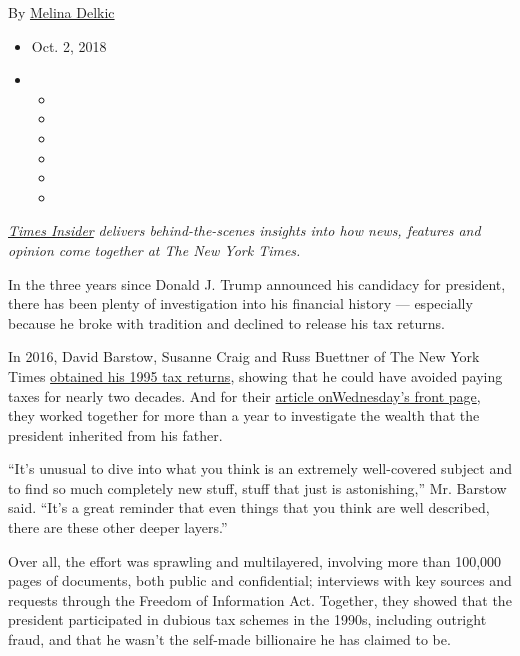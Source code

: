 By \href{https://www.nytimes3xbfgragh.onion/by/melina-delkic}{Melina
Delkic}

\begin{itemize}
\item
  Oct. 2, 2018
\item
  \begin{itemize}
  \item
  \item
  \item
  \item
  \item
  \item
  \end{itemize}
\end{itemize}

\href{http://www.nytimes3xbfgragh.onion/section/insider}{\emph{Times
Insider}} \emph{delivers behind-the-scenes insights into how news,
features and opinion come together at The New York Times.}

In the three years since Donald J. Trump announced his candidacy for
president, there has been plenty of investigation into his financial
history --- especially because he broke with tradition and declined to
release his tax returns.

In 2016, David Barstow, Susanne Craig and Russ Buettner of The New York
Times
\href{https://www.nytimes3xbfgragh.onion/2016/10/02/us/politics/donald-trump-taxes.html}{obtained
his 1995 tax returns}, showing that he could have avoided paying taxes
for nearly two decades. And for their
\href{https://www.nytimes3xbfgragh.onion/interactive/2018/10/02/us/politics/donald-trump-tax-schemes-fred-trump.html}{article
on}\href{https://www.nytimes3xbfgragh.onion/interactive/2018/10/02/us/politics/donald-trump-tax-schemes-fred-trump.html}{Wednesday's
front page}, they worked together for more than a year to investigate
the wealth that the president inherited from his father.

``It's unusual to dive into what you think is an extremely well-covered
subject and to find so much completely new stuff, stuff that just is
astonishing,'' Mr. Barstow said. ``It's a great reminder that even
things that you think are well described, there are these other deeper
layers.''

Over all, the effort was sprawling and multilayered, involving more than
100,000 pages of documents, both public and confidential; interviews
with key sources and requests through the Freedom of Information Act.
Together, they showed that the president participated in dubious tax
schemes in the 1990s, including outright fraud, and that he wasn't the
self-made billionaire he has claimed to be.

